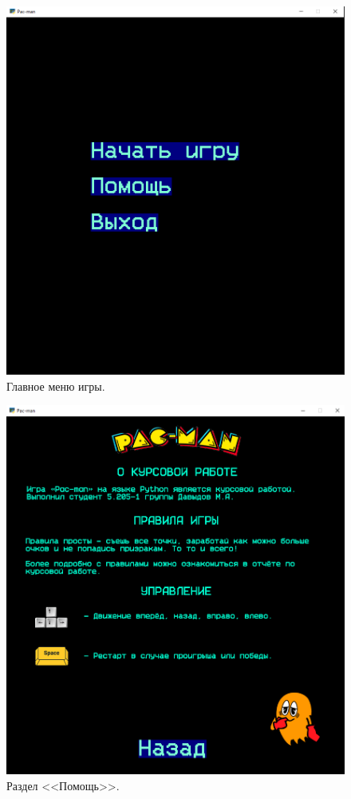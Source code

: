 \documentclass[14pt, oneside]{altsu-report}
\begin{document}
\begin{figure}[H]
	\centering
	\includegraphics[width=1\linewidth]{images/1.png}
	\caption{Главное меню игры.}
	\label{fig2}
\end{figure}

\begin{figure}[H]
	\centering
	\includegraphics[width=1\linewidth]{images/2.png}
	\caption{Раздел <<Помощь>>.}
	\label{fig3}
\end{figure}
\end{document}
